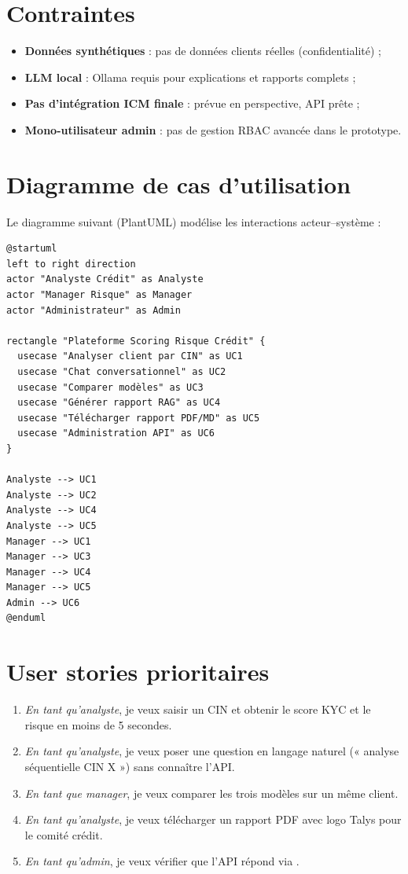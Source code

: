 \section{Contraintes}

\begin{itemize}[leftmargin=*]
  \item \textbf{Données synthétiques} : pas de données clients réelles (confidentialité) ;
  \item \textbf{LLM local} : Ollama requis pour explications et rapports complets ;
  \item \textbf{Pas d'intégration ICM finale} : prévue en perspective, API prête ;
  \item \textbf{Mono-utilisateur admin} : pas de gestion RBAC avancée dans le prototype.
\end{itemize}

\section{Diagramme de cas d'utilisation}

Le diagramme suivant (PlantUML) modélise les interactions acteur--système :

\begin{lstlisting}[language={},caption={Diagramme de cas d'utilisation (PlantUML)},label={lst:usecase}]
@startuml
left to right direction
actor "Analyste Crédit" as Analyste
actor "Manager Risque" as Manager
actor "Administrateur" as Admin

rectangle "Plateforme Scoring Risque Crédit" {
  usecase "Analyser client par CIN" as UC1
  usecase "Chat conversationnel" as UC2
  usecase "Comparer modèles" as UC3
  usecase "Générer rapport RAG" as UC4
  usecase "Télécharger rapport PDF/MD" as UC5
  usecase "Administration API" as UC6
}

Analyste --> UC1
Analyste --> UC2
Analyste --> UC4
Analyste --> UC5
Manager --> UC1
Manager --> UC3
Manager --> UC4
Manager --> UC5
Admin --> UC6
@enduml
\end{lstlisting}

\section{User stories prioritaires}

\begin{enumerate}[leftmargin=*]
  \item \textit{En tant qu'analyste}, je veux saisir un CIN et obtenir le score KYC et le risque en moins de 5 secondes.
  \item \textit{En tant qu'analyste}, je veux poser une question en langage naturel (« analyse séquentielle CIN X ») sans connaître l'API.
  \item \textit{En tant que manager}, je veux comparer les trois modèles sur un même client.
  \item \textit{En tant qu'analyste}, je veux télécharger un rapport PDF avec logo Talys pour le comité crédit.
  \item \textit{En tant qu'admin}, je veux vérifier que l'API répond via .
\end{enumerate}

